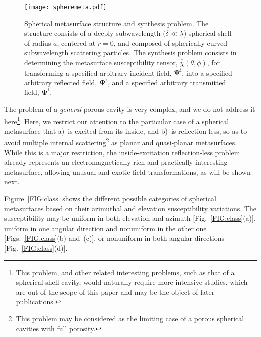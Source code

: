 \documentclass[journal,transaction]{IEEEtran}
\newcommand{\ve}[1]{\mathbf{#1}}
\newcommand{\te}[1]{\overline{\overline{#1}}}
\begin{document}
\begin{figure}[!h]
    \centering
         \texttt{[image: spheremeta.pdf]}{
        }
        \caption{Spherical metasurface structure and synthesis problem. The structure consists of a deeply subwavelength ($\delta\ll\lambda$) spherical shell of radius $a$, centered at $r=0$, and composed of spherically curved subwavelength scattering particles. The synthesis problem consists in determining the metasurface susceptibility tensor, $\te{\chi}(\theta,\phi)$, for transforming a specified arbitrary incident field, $\ve{\Psi}^\text{i}$, into a specified arbitrary reflected field, $\ve{\Psi}^\text{r}$, and a specified arbitrary transmitted field, $\ve{\Psi}^\text{t}$.}
   \label{FIG:sphere}
\end{figure}

The problem of a \emph{general} porous cavity is very complex, and we do not address it here\footnote{This problem, and other related interesting problems, such as that of a spherical-shell cavity, would naturally require more intensive studies, which are out of the scope of this paper and may be the object of later publications.}. Here, we restrict our attention to the particular case of a spherical metasurface that a)~is excited from its inside, and b)~is reflection-less, so as to avoid multiple internal scattering\footnote{This problem may be considered as the limiting case of a porous spherical cavities with full porosity.} as planar and quasi-planar metasurfaces. While this is a major restriction, the inside-excitation reflection-less problem already represents an electromagnetically rich and practically interesting metasurface, allowing unusual and exotic field transformations, as will be shown next.

Figure~\ref{FIG:class} shows the different possible categories of spherical metasurfaces based on their azimuthal and elevation susceptibility variations. The susceptibility may be uniform in both elevation and azimuth [Fig.~\ref{FIG:class}(a)], uniform in one angular direction and nonuniform in the other one [Figs.~\ref{FIG:class}(b) and~(c)], or nonuniform in both angular directions [Fig.~\ref{FIG:class}(d)].
\end{document}
